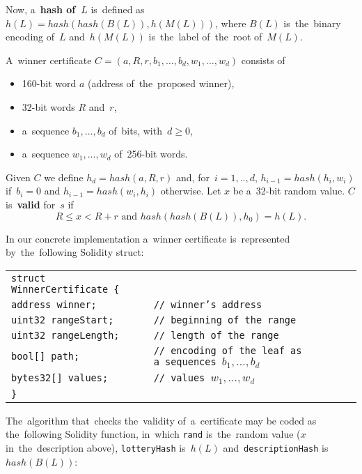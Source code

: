 \documentclass[a4paper]{article}
\begin{document}
    Now, a~\textbf{hash of~$L$} is~defined as $h(L) = hash(hash(B(L)), h(M(L)))$, where $B(L)$ is~the~binary encoding of~$L$
    and~$h(M(L))$ is~the~label of~the~root of~$M(L)$.

    A~winner certificate $C = (a, R, r, b_1, \ldots, b_d, w_1, \ldots, w_d)$ consists of
    \begin{itemize}
        \item 160-bit word $a$ (address of~the~proposed winner),
        \item 32-bit words $R$ and~$r$,
        \item a~sequence $b_1, \ldots, b_d$ of~bits, with~$d \geq 0$,
        \item a~sequence $w_1, \ldots, w_d$ of~256-bit words.
    \end{itemize}

    Given $C$ we define $h_d = hash(a, R, r)$ and, for~$i = 1, .., d$, $h_{i-1} = hash(h_i, w_i)$ if~$b_i = 0$ and
    $h_{i-1} = hash(w_i, h_i)$ otherwise.
    Let $x$ be a~32-bit random value. $C$ is~\textbf{valid} for~$s$ if
    \begin{displaymath}
        R \leq x < R + r  \text{ and~} hash(hash(B(L)), h_0) = h(L).
    \end{displaymath}

    In our concrete implementation a~winner certificate is~represented by~the~following Solidity struct:

    \begin{center}
        \begin{tabular}{ll}
            \texttt{struct WinnerCertificate \{} &  \\
		    \qquad \texttt{address winner;} &  \texttt{// winner's address}\\
		    \qquad \texttt{uint32 rangeStart;} & \texttt{// beginning of~the~range}\\
		    \qquad \texttt{uint32 rangeLength;} & \texttt{// length of~the~range}\\
		    \qquad \texttt{bool[] path;} & \texttt{// encoding of~the~leaf as a~sequences $b_1, \ldots, b_d$}\\
		    \qquad \texttt{bytes32[] values;} & \texttt{// values $w_1, \ldots, w_d$}\\
    		\texttt{\}}
        \end{tabular}
    \end{center}

    The~algorithm that~checks the~validity of~a~certificate may be coded as the~following Solidity function,
    in~which \texttt{rand} is~the~random value ($x$ in~the~description above), \texttt{lotteryHash} is~$h(L)$
    and~\texttt{descriptionHash} is~$hash(B(L))$:
\end{document}

